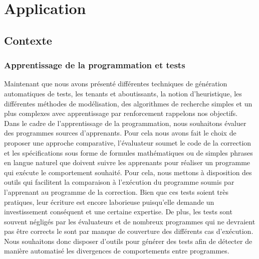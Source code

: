 \chapter{Application}

\label{Chapter2} %

\section{Contexte}

\subsection{Apprentissage de la programmation et tests}
Maintenant que nous avons présenté différentes techniques de génération automatiques de tests, les tenants et aboutissants, la notion d'heuristique, les différentes méthodes de modélisation, des algorithmes de recherche simples et un plus complexes avec apprentissage par renforcement rappelons nos objectifs.\\

Dans le cadre de l'apprentissage de la programmation, nous souhaitons évaluer des programmes sources d'apprenants. Pour cela nous avons fait le choix de proposer une approche comparative, l'évaluateur soumet le code de la correction et les spécifications sous forme de formules mathématiques ou de simples phrases en langue naturel que doivent suivre les apprenants pour réaliser un programme qui exécute le comportement souhaité.
Pour cela, nous mettons à disposition des outils qui facilitent la comparaison à l'exécution du programme soumis par l'apprenant au programme de la correction.
Bien que ces tests soient très pratiques, leur écriture est encore laborieuse puisqu'elle demande un investissement conséquent et une certaine expertise. De plus, les tests sont souvent négligés par les évaluateurs et de nombreux programmes qui ne devraient pas être corrects le sont par manque de couverture des différents cas d'exécution.
Nous souhaitons donc disposer d'outils pour générer des tests afin de détecter de manière automatisé les divergences de comportements entre programmes.

